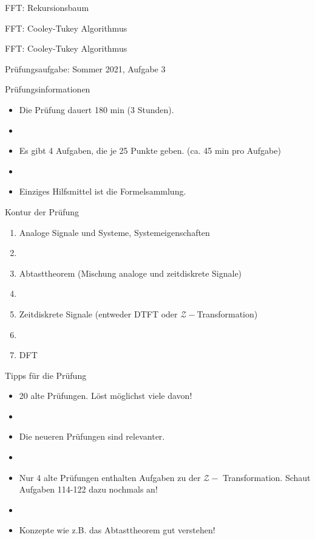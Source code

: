 \documentclass[14pt, aspectratio=169, handout]{beamer}
\begin{document}
\begin{frame}{FFT: Rekursionsbaum}
    
\end{frame}

\begin{frame}{FFT: Cooley-Tukey Algorithmus}
    
\end{frame}

\begin{frame}{FFT: Cooley-Tukey Algorithmus}
    
\end{frame}

\begin{frame}{Prüfungsaufgabe: Sommer 2021, Aufgabe 3}
    
\end{frame}

\begin{frame}{Prüfungsinformationen}
    \begin{itemize}
        \item Die Prüfung dauert 180 min (3 Stunden).
        \item[] 
        \item Es gibt 4 Aufgaben, die je 25 Punkte geben. (ca. 45 min pro Aufgabe)
        \item[]
        \item Einziges Hilfsmittel ist die Formelsammlung.
    \end{itemize}
\end{frame}

\begin{frame}{Kontur der Prüfung}
    \begin{enumerate}
        \item Analoge Signale und Systeme, Systemeigenschaften
        \item[] 
        \item Abtasttheorem (Mischung analoge und zeitdiskrete Signale)
        \item[] 
        \item Zeitdiskrete Signale (entweder DTFT oder $\mathcal{Z}-$Transformation)
        \item[] 
        \item DFT
    \end{enumerate}
\end{frame}

\begin{frame}{Tipps für die Prüfung}
    \begin{itemize}
        \item 20 alte Prüfungen. Löst möglichst viele davon!
        \item[] 
        \item Die neueren Prüfungen sind relevanter.
        \item[] 
        \item Nur 4 alte Prüfungen enthalten Aufgaben zu der $\mathcal{Z}-$ Transformation. Schaut Aufgaben 114-122 dazu nochmals an!
        \item[] 
        \item Konzepte wie z.B. das Abtasttheorem gut verstehen!
    \end{itemize}
\end{frame}
\end{document}
